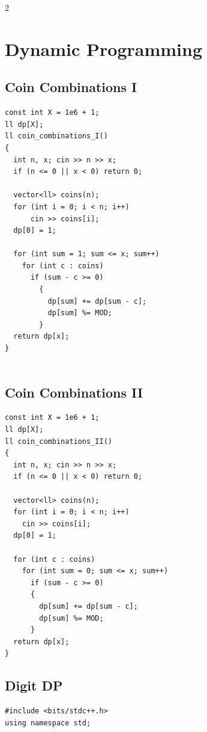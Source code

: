 \documentclass[twoside]{article}
\begin{document}
\begin{multicols*}{2}
	{
		\section*{Dynamic Programming}
	}
	{
		\subsection*{Coin Combinations I}
	}
	\begin{verbatim}
const int X = 1e6 + 1;
ll dp[X];
ll coin_combinations_I()
{
  int n, x; cin >> n >> x;
  if (n <= 0 || x < 0) return 0;

  vector<ll> coins(n);
  for (int i = 0; i < n; i++)
      cin >> coins[i];
  dp[0] = 1;

  for (int sum = 1; sum <= x; sum++)
    for (int c : coins)
      if (sum - c >= 0)
        {
          dp[sum] += dp[sum - c];
          dp[sum] %= MOD;
        }
  return dp[x];
}


\end{verbatim}

	{
		\subsection*{Coin Combinations II}
	}
	\begin{verbatim}
const int X = 1e6 + 1;
ll dp[X];
ll coin_combinations_II()
{
  int n, x; cin >> n >> x;
  if (n <= 0 || x < 0) return 0;

  vector<ll> coins(n);
  for (int i = 0; i < n; i++)
    cin >> coins[i];
  dp[0] = 1;

  for (int c : coins)
    for (int sum = 0; sum <= x; sum++)
      if (sum - c >= 0)
      {
        dp[sum] += dp[sum - c];
        dp[sum] %= MOD;
      }
  return dp[x];
}

\end{verbatim}

	{
		\subsection*{Digit DP}
	}
	\begin{verbatim}
#include <bits/stdc++.h>
using namespace std;


\end{verbatim}
\end{multicols*}
\end{document}
